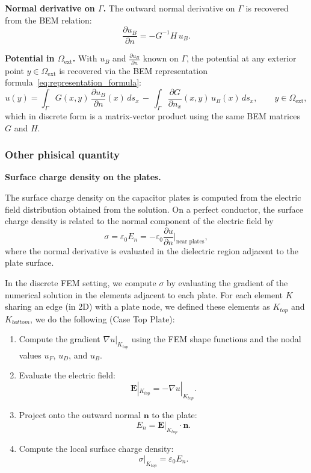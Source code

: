 \documentclass[11pt,onecolumn]{article}
\begin{document}
\textbf{Normal derivative on $\Gamma$.}
The outward normal derivative on $\Gamma$ is recovered from the BEM 
relation:
\begin{equation}
\frac{\partial u_B}{\partial n} = -G^{-1} H\, u_B.
\end{equation}

\textbf{Potential in $\Omega_{\text{ext}}$.}
With $u_B$ and $\frac{\partial u_B}{\partial n}$ known on $\Gamma$, the potential at any 
exterior point $y \in \Omega_{\text{ext}}$ is recovered via the BEM representation 
formula~\eqref{eq:representation_formula}:
\begin{equation}
u(y) = \int_\Gamma G(x,y)\,\frac{\partial u_B}{\partial n}(x)\,ds_x 
\,-\, \int_\Gamma \frac{\partial G}{\partial n_x}(x,y)\,u_B(x)\,ds_x,
\qquad y \in \Omega_{\text{ext}},
\end{equation}
which in discrete form is a matrix-vector product using the same BEM matrices $G$ and $H$.

\subsubsection{Other phisical quantity}\label{subsec:compute_phisical_quantity}

\textbf{Surface charge density on the plates.}
\label{sec:charge_density}

The surface charge density on the capacitor plates is computed from the electric field distribution obtained from the solution. On a perfect conductor, the surface charge density is related to the normal component of the electric field by
\begin{equation}
\sigma = \varepsilon_0 E_n = -\varepsilon_0 \frac{\partial u}{\partial n}\bigg|_{\text{near plates}},
\end{equation}
where the normal derivative is evaluated in the dielectric region adjacent to the plate surface.

In the discrete FEM setting, we compute $\sigma$ by evaluating the gradient of the numerical solution in the elements adjacent to each plate. For each element $K$ sharing an edge (in 2D) with a plate node, we defined these elements as $K_{top}$ and $K_{bottom}$, we do the following (Case Top Plate):

\begin{enumerate}
    \item Compute the gradient $\nabla u|_{K_{top}}$ using the FEM shape functions and the nodal values $u_F$, $u_D$, and $u_B$.
    
    \item Evaluate the electric field:
    \[
    \mathbf{E}|_{K_{top}} = -\nabla u|_{K_{top}} .
    \]
    
    \item Project onto the outward normal $\mathbf{n}$ to the plate:
    \[
    E_n = \mathbf{E}|_{K_{top}} \cdot \mathbf{n}.
    \]
    
    \item Compute the local surface charge density:
    \[
    \sigma|_{K_{top}} = \varepsilon_0 E_n .
    \]
\end{enumerate}
\end{document}
